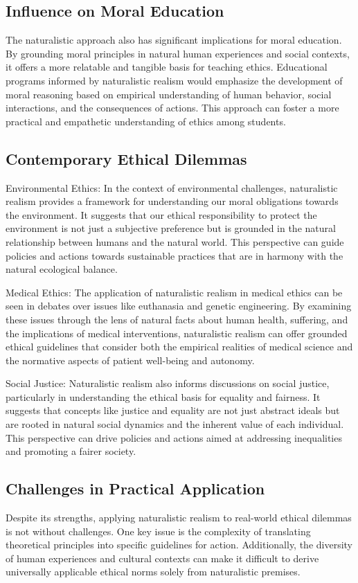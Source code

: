 \documentclass[12pt,a4paper]{article}
\begin{document}
\subsection{Influence on Moral Education}
The naturalistic approach also has significant implications for moral education. By grounding moral principles in natural human experiences and social contexts, it offers a more relatable and tangible basis for teaching ethics. Educational programs informed by naturalistic realism would emphasize the development of moral reasoning based on empirical understanding of human behavior, social interactions, and the consequences of actions. This approach can foster a more practical and empathetic understanding of ethics among students.

\subsection{Contemporary Ethical Dilemmas}
Environmental Ethics: In the context of environmental challenges, naturalistic realism provides a framework for understanding our moral obligations towards the environment. It suggests that our ethical responsibility to protect the environment is not just a subjective preference but is grounded in the natural relationship between humans and the natural world. This perspective can guide policies and actions towards sustainable practices that are in harmony with the natural ecological balance.

Medical Ethics: The application of naturalistic realism in medical ethics can be seen in debates over issues like euthanasia and genetic engineering. By examining these issues through the lens of natural facts about human health, suffering, and the implications of medical interventions, naturalistic realism can offer grounded ethical guidelines that consider both the empirical realities of medical science and the normative aspects of patient well-being and autonomy.

Social Justice: Naturalistic realism also informs discussions on social justice, particularly in understanding the ethical basis for equality and fairness. It suggests that concepts like justice and equality are not just abstract ideals but are rooted in natural social dynamics and the inherent value of each individual. This perspective can drive policies and actions aimed at addressing inequalities and promoting a fairer society.

\subsection{Challenges in Practical Application}
Despite its strengths, applying naturalistic realism to real-world ethical dilemmas is not without challenges. One key issue is the complexity of translating theoretical principles into specific guidelines for action. Additionally, the diversity of human experiences and cultural contexts can make it difficult to derive universally applicable ethical norms solely from naturalistic premises.
\end{document}
